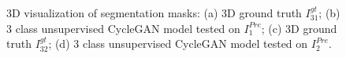 \begin{figure}[!htb]
\centering
{}\hfil
{}

\hfil 
{}

\caption{3D visualization of segmentation masks: (a) 3D ground truth $I^{gt}_{31}$; (b) 3 class unsupervised CycleGAN model tested on $I^{Pre}_1$; (c) 3D ground truth $I^{gt}_{32}$; (d) 3 class unsupervised CycleGAN model tested on $I^{Pre}_2$.}

\label{fig:results-cycleGAN-3channel}



\end{figure}

